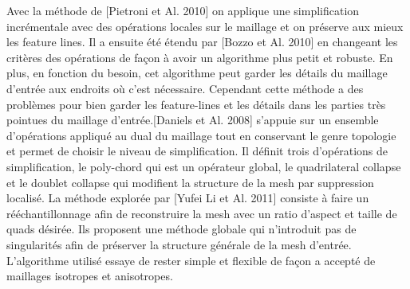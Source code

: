 \documentclass[runningheads]{llncs}
\begin{document}
Avec la méthode de [Pietroni et Al. 2010]\cite{tarini_practical_2010} on applique une simplification incrémentale avec des opérations locales sur le maillage et on préserve aux mieux les feature lines. Il a ensuite été étendu par [Bozzo et Al. 2010]\cite{bozzo_adaptive_2010} en changeant les critères des opérations de façon à avoir un algorithme plus petit et robuste. En plus, en fonction du besoin, cet algorithme peut garder les détails du maillage d'entrée aux endroits où c’est nécessaire. Cependant cette méthode a des problèmes pour bien garder les feature-lines et les détails dans les parties très pointues du maillage d'entrée.[Daniels et Al. 2008]\cite{daniels_quadrilateral_2008} s’appuie sur un ensemble d'opérations appliqué au dual du maillage tout en conservant le genre topologie et permet de choisir le niveau de simplification. Il définit trois d'opérations de simplification, le poly-chord qui est un opérateur global,  le quadrilateral collapse et le doublet collapse qui modifient la structure de la mesh par suppression localisé. La méthode explorée par [Yufei Li et Al. 2011]\cite{li_shape_2011} consiste à faire un rééchantillonnage afin de reconstruire la mesh avec un ratio d’aspect et taille de quads 
désirée. Ils proposent une méthode globale qui n’introduit pas de singularités afin de préserver la structure générale de la mesh d’entrée. L’algorithme utilisé essaye de rester simple et flexible de façon a accepté de maillages isotropes et anisotropes.
\end{document}
